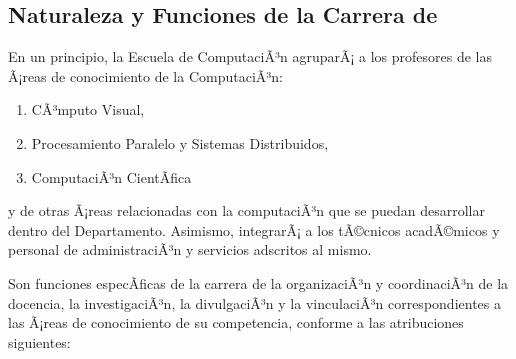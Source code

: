 \subsection{Naturaleza y Funciones de la Carrera de \SchoolShortName}
En un principio, la Escuela de ComputaciÃ³n agruparÃ¡ a los profesores de las Ã¡reas de conocimiento de la ComputaciÃ³n:
\begin{enumerate}[ a) ]
\item CÃ³mputo Visual,
\item Procesamiento Paralelo y Sistemas Distribuidos,
\item ComputaciÃ³n CientÃ­fica
\end{enumerate}
y de otras Ã¡reas relacionadas con la computaciÃ³n que se puedan desarrollar dentro del Departamento. Asimismo, integrarÃ¡ a los tÃ©cnicos acadÃ©micos y personal de administraciÃ³n y servicios adscritos al mismo.

Son funciones especÃ­ficas de la carrera de \SchoolShortName la organizaciÃ³n y coordinaciÃ³n de la docencia, la investigaciÃ³n, la divulgaciÃ³n y la vinculaciÃ³n correspondientes a las Ã¡reas de conocimiento de su competencia, conforme a las atribuciones siguientes: 

